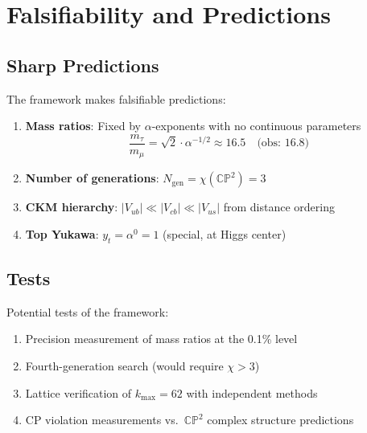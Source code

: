 \documentclass[11pt,a4paper]{article}
\newcommand{\CP}{\mathbb{CP}}
\begin{document}
\section{Falsifiability and Predictions}

\subsection{Sharp Predictions}

The framework makes falsifiable predictions:

\begin{enumerate}
\item \textbf{Mass ratios}: Fixed by $\alpha$-exponents with no continuous parameters
\begin{equation}
\frac{m_\tau}{m_\mu} = \sqrt{2} \cdot \alpha^{-1/2} \approx 16.5 \quad \text{(obs: 16.8)}
\end{equation}

\item \textbf{Number of generations}: $N_{\text{gen}} = \chi(\CP^2) = 3$

\item \textbf{CKM hierarchy}: $|V_{ub}| \ll |V_{cb}| \ll |V_{us}|$ from distance ordering

\item \textbf{Top Yukawa}: $y_t = \alpha^0 = 1$ (special, at Higgs center)
\end{enumerate}

\subsection{Tests}

Potential tests of the framework:
\begin{enumerate}
\item Precision measurement of mass ratios at the 0.1\% level
\item Fourth-generation search (would require $\chi > 3$)
\item Lattice verification of $k_{\max} = 62$ with independent methods
\item CP violation measurements vs.\ $\CP^2$ complex structure predictions
\end{enumerate}

\end{document}
